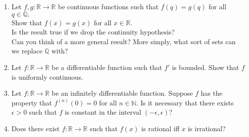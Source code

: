 \documentclass{article}
\begin{document}
\begin{enumerate}
	\item Let $f, g: \mathbb{R} \to \mathbb{R}$ be continuous functions such that $f(q) = g(q)$ for all $q \in \mathbb{Q}.$\\
	Show that $f(x) = g(x)$ for all $x \in \mathbb{R}.$\\
	Is the result true if we drop the continuity hypothesis?\\
	Can you think of a more general result? More simply, what sort of sets can we replace $\mathbb{Q}$ with?
	\item Let $f:\mathbb{R} \to \mathbb{R}$ be a differentiable function such that $f'$ is bounded. Show that $f$ is uniformly continuous.
	\item Let $f:\mathbb{R} \to \mathbb{R}$ be an infinitely differentiable function. Suppose $f$ has the property that $f^{(n)}(0) = 0$ for all $n \in \mathbb{N}.$ Is it necessary that there exists $\epsilon > 0$ such that $f$ is constant in the interval $(-\epsilon, \epsilon)?$
	\item Does there exist $f:\mathbb{R}\to\mathbb{R}$ such that $f(x)$ is rational iff $x$ is irrational?
\end{enumerate}
\end{document}
